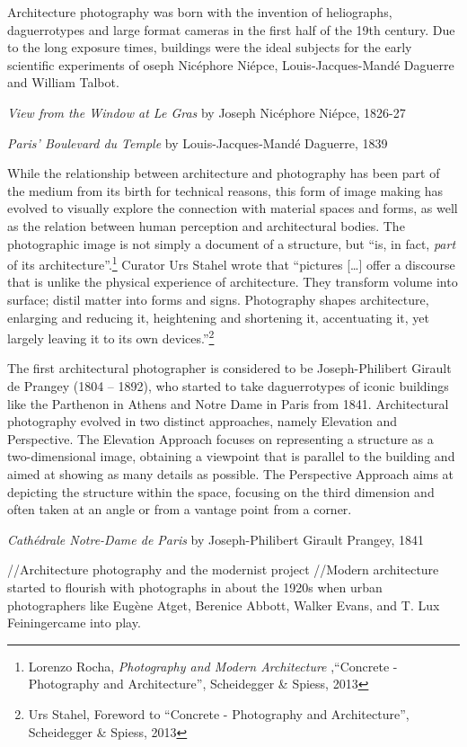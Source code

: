 \documentclass[
  openany]{book}
\begin{document}
Architecture photography was born with the invention of heliographs, daguerrotypes and large format cameras in the first half of the 19th century. Due to the long exposure times, buildings were the ideal subjects for the early scientific experiments of oseph Nicéphore Niépce, Louis-Jacques-Mandé Daguerre and William Talbot.

\emph{View from the Window at Le Gras} by Joseph Nicéphore Niépce, 1826-27

\emph{Paris' Boulevard du Temple} by Louis-Jacques-Mandé Daguerre, 1839

While the relationship between architecture and photography has been part of the medium from its birth for technical reasons, this form of image making has evolved to visually explore the connection with material spaces and forms, as well as the relation between human perception and architectural bodies. The photographic image is not simply a document of a structure, but ``is, in fact, \emph{part} of its architecture''.\footnote{Lorenzo Rocha, \emph{Photography and Modern Architecture} ,``Concrete - Photography and Architecture'', Scheidegger \& Spiess, 2013} Curator Urs Stahel wrote that ``pictures {[}\ldots{]} offer a discourse that is unlike the physical experience of architecture. They transform volume into surface; distil matter into forms and signs. Photography shapes architecture, enlarging and reducing it, heightening and shortening it, accentuating it, yet largely leaving it to its own devices.''\footnote{Urs Stahel, Foreword to ``Concrete - Photography and Architecture'', Scheidegger \& Spiess, 2013}

The first architectural photographer is considered to be Joseph-Philibert Girault de Prangey (1804 -- 1892), who started to take daguerrotypes of iconic buildings like the Parthenon in Athens and Notre Dame in Paris from 1841. Architectural photography evolved in two distinct approaches, namely Elevation and Perspective. The Elevation Approach focuses on representing a structure as a two-dimensional image, obtaining a viewpoint that is parallel to the building and aimed at showing as many details as possible. The Perspective Approach aims at depicting the structure within the space, focusing on the third dimension and often taken at an angle or from a vantage point from a corner.

\emph{Cathédrale Notre-Dame de Paris} by Joseph-Philibert Girault Prangey, 1841

//Architecture photography and the modernist project
//Modern architecture started to flourish with photographs in about the 1920s when urban photographers like Eugène Atget, Berenice Abbott, Walker Evans, and T. Lux Feiningercame into play.
\end{document}
